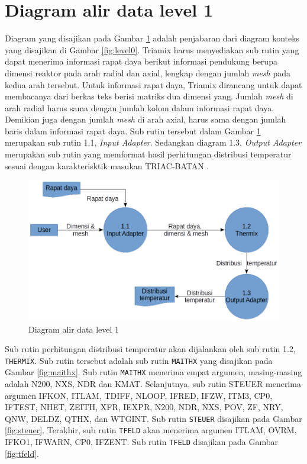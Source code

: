 \documentclass[a4paper,11pt]{report}
\begin{document}
\section{Diagram alir data level 1}
Diagram yang disajikan pada Gambar \ref{fig:level1} adalah penjabaran dari diagram konteks yang disajikan di Gambar \ref{fig:level0}. Triamix harus menyediakan sub rutin yang dapat menerima informasi rapat daya berikut informasi pendukung berupa dimensi reaktor pada arah radial dan
axial, lengkap dengan jumlah \textit{mesh} pada kedua arah tersebut. Untuk informasi rapat daya, Triamix dirancang untuk dapat membacanya dari berkas teks berisi matriks dua dimensi yang. Jumlah \textit{mesh} di arah radial harus sama dengan jumlah kolom dalam informasi rapat daya. Demikian juga dengan jumlah \textit{mesh} di arah axial, harus sama dengan jumlah baris dalam informasi rapat daya. Sub rutin tersebut dalam Gambar \ref{fig:level1} merupakan sub rutin 1.1, \textit{Input Adapter}. Sedangkan diagram 1.3, \textit{Output Adapter} merupakan sub rutin yang
memformat hasil perhitungan distribusi temperatur sesuai dengan karakterisktik masukan TRIAC-BATAN \cite{triac1}.

\begin{figure}[h!]
  \begin{center}
    \includegraphics[scale=.5]{pics/level1.png}
    \caption{Diagram alir data level 1}
    \label{fig:level1}
  \end{center}
\end{figure}

Sub rutin perhitungan distribusi temperatur akan dijalankan oleh sub rutin 1.2, \texttt{THERMIX}. Sub rutin tersebut adalah sub rutin \texttt{MAITHX} yang disajikan pada Gambar \ref{fig:maithx}. Sub rutin \texttt{MAITHX} menerima empat argumen, masing-masing adalah N200, NXS, NDR dan KMAT. Selanjutnya, sub rutin STEUER menerima argumen IFKON, ITLAM, TDIFF, NLOOP, IFRED, IFZW, ITM3, CP0, IFTEST, NHET, ZEITH, XFR, IEXPR, N200, NDR, NXS, POV, ZF, NRY, QNW, DELDZ, QTHX, dan WTGINT. Sub rutin \texttt{STEUER} disajikan pada Gambar \ref{fig:steuer}. Terakhir, sub rutin \texttt{TFELD} akan menerima argumen ITLAM, OVRM, IFKO1, IFWARN, CP0, IFZENT. Sub rutin \texttt{TFELD} disajikan pada Gambar \ref{fig:tfeld}.
\end{document}

